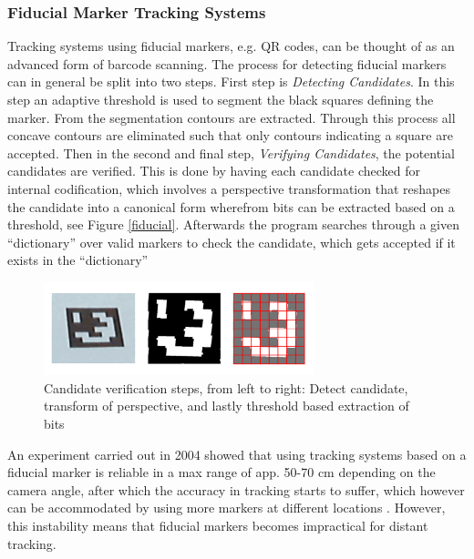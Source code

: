 \subsubsection{Fiducial Marker Tracking Systems} 
Tracking systems using fiducial markers, e.g. QR codes, can be thought of as an advanced form of barcode scanning. The process for detecting fiducial markers can in general be split into two steps. First step is \textit{Detecting Candidates}. In this step an adaptive threshold is used to segment the black squares defining the marker. From the segmentation contours are extracted. Through this process all concave contours are eliminated such that only contours indicating a square are accepted. Then in the second and final step, \textit{Verifying Candidates}, the potential candidates are verified. This is done by having each candidate checked for internal codification, which involves a perspective transformation that reshapes the candidate into a canonical form wherefrom bits can be extracted based on a threshold, see Figure \ref{fiducial}. Afterwards the program searches through a  given “dictionary” over valid markers to check the candidate, which gets accepted if it exists in the “dictionary” \cite{Young}

\begin{figure}[h!]
    \centering
    \includegraphics[width=0.7\textwidth]{figures/Fiducial.png}
    \caption{Candidate verification steps, from left to right: Detect candidate, transform of perspective, and lastly threshold based extraction of bits}\label{fig:fiducial}
\end{figure}

An experiment carried out in 2004 showed that using tracking systems based on a fiducial marker is reliable in a max range of app. 50-70 cm depending on the camera angle, after which the accuracy in tracking starts to suffer, which however can be accommodated by using more markers at different locations \cite{Abawi et al.}. However, this instability means that fiducial markers becomes impractical for distant tracking.


